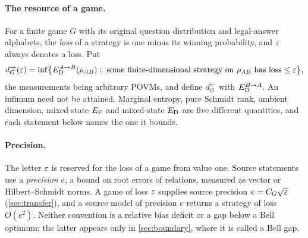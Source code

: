 \paragraph{The resource of a game.} For a finite game $G$ with its original question distribution and legal-answer
alphabets, the \emph{loss} of a strategy is one minus its winning probability, and $\varepsilon$ always denotes a loss. Put
\begin{equation}\label{eq:dG}
d_G^\to(\varepsilon)=\inf\bigl\{E_{\mathrm D}^{A\to B}(\rho_{AB}):\ \text{some finite-dimensional strategy on }\rho_{AB}\text{ has loss}\le\varepsilon\bigr\},
\end{equation}
the measurements being arbitrary POVMs, and define $d_G^\leftarrow$ with $E_{\mathrm D}^{B\to A}$. An infimum need not be attained.
Marginal entropy, pure Schmidt rank, ambient dimension, mixed-state $E_{\mathrm F}$ and mixed-state $E_{\mathrm D}$ are five different
quantities, and each statement below names the one it bounds.

\paragraph{Precision.} The letter $\varepsilon$ is reserved for the loss of a game from value one. Source statements use a
\emph{precision} $e$, a bound on root errors of relations, measured as vector or Hilbert--Schmidt norms. A game of loss
$\varepsilon$ supplies source precision $e=C_G\sqrt{\varepsilon}$ (\cref{sec:transfer}), and a source model of precision $e$ returns a
strategy of loss $O(e^2)$. Neither convention is a relative bias deficit or a gap below a Bell optimum; the latter
appears only in \cref{sec:boundary}, where it is called a Bell gap.

